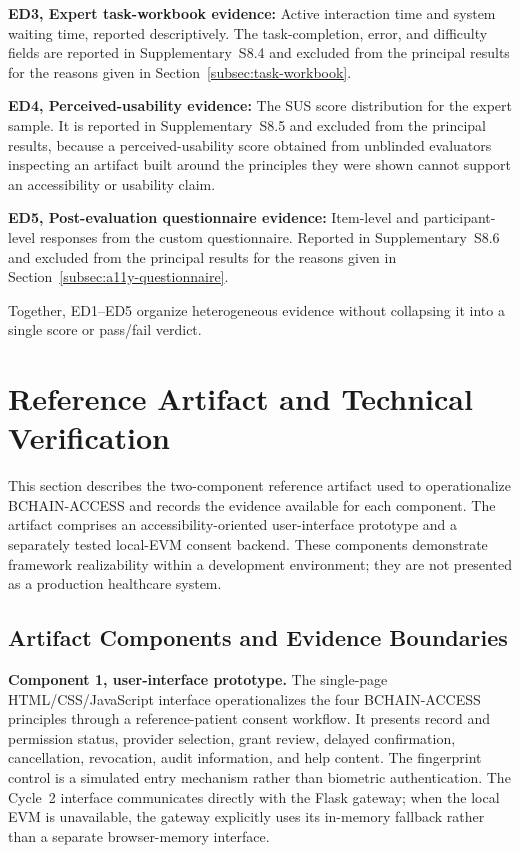 \documentclass[journal]{IEEEtran}
\begin{document}
\noindent\textbf{ED3, Expert task-workbook evidence:} Active interaction time and system waiting time, reported descriptively. The task-completion, error, and difficulty fields are reported in Supplementary~S8.4 and excluded from the principal results for the reasons given in Section~\ref{subsec:task-workbook}.

\noindent\textbf{ED4, Perceived-usability evidence:} The SUS score distribution for the expert sample. It is reported in Supplementary~S8.5 and excluded from the principal results, because a perceived-usability score obtained from unblinded evaluators inspecting an artifact built around the principles they were shown cannot support an accessibility or usability claim.

\noindent\textbf{ED5, Post-evaluation questionnaire evidence:} Item-level and participant-level responses from the custom questionnaire. Reported in Supplementary~S8.6 and excluded from the principal results for the reasons given in Section~\ref{subsec:a11y-questionnaire}.

Together, ED1--ED5 organize heterogeneous evidence without collapsing it into a single score or pass/fail verdict.

\section{Reference Artifact and Technical Verification}
\label{sec:implementation}

This section describes the two-component reference artifact used to operationalize BCHAIN-ACCESS and records the evidence available for each component. The artifact comprises an accessibility-oriented user-interface prototype and a separately tested local-EVM consent backend. These components demonstrate framework realizability within a development environment; they are not presented as a production healthcare system.

\subsection{Artifact Components and Evidence Boundaries}

\noindent\textbf{Component 1, user-interface prototype.}
The single-page HTML/CSS/JavaScript interface operationalizes the four BCHAIN-ACCESS principles through a reference-patient consent workflow. It presents record and permission status, provider selection, grant review, delayed confirmation, cancellation, revocation, audit information, and help content. The fingerprint control is a simulated entry mechanism rather than biometric authentication. The Cycle~2 interface communicates directly with the Flask gateway; when the local EVM is unavailable, the gateway explicitly uses its in-memory fallback rather than a separate browser-memory interface.
\end{document}
